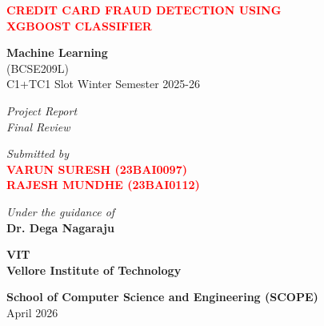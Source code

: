 \documentclass[12pt,a4paper]{report}
\begin{document}
\raggedbottom
\begin{titlepage}
\centering
\vspace*{1cm}

{\LARGE \textbf{\textcolor{red}{CREDIT CARD FRAUD DETECTION USING\\[4pt] XGBOOST CLASSIFIER}}}

\vspace{1.5cm}

{\Large \textbf{Machine Learning}\\[4pt]
(BCSE209L)\\[4pt]
C1+TC1 Slot Winter Semester 2025-26}

\vspace{1.2cm}

{\large \textit{Project Report}\\
\textit{Final Review}}

\vspace{1.2cm}

{\large \textit{Submitted by}\\[6pt]
\textbf{\textcolor{red}{VARUN SURESH (23BAI0097)}}\\
\textbf{\textcolor{red}{RAJESH MUNDHE (23BAI0112)}}}

\vspace{1.5cm}

{\large \textit{Under the guidance of}\\[4pt]
\textbf{Dr. Dega Nagaraju}}

\vspace{1.5cm}

{\Large \textbf{VIT}}\\[4pt]
{\large \textbf{Vellore Institute of Technology}\\}

\vspace{0.8cm}

{\large \textbf{School of Computer Science and Engineering (SCOPE)}\\[6pt]
April 2026}

\end{titlepage}

\clearpage
{}
\thispagestyle{fancy}
\end{document}

